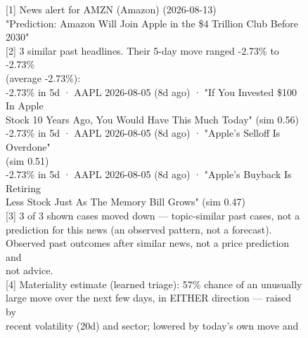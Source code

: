 \begin{figure}[ht]
\centering
\begin{tcolorbox}[colback=black!3, colframe=black!35, boxrule=0.4pt, arc=2pt,
                  width=0.97\textwidth, fontupper=\ttfamily\scriptsize]
\textcolor{black!55}{[1]} News alert for AMZN (Amazon) (2026-08-13)\\
\hspace*{1em}"Prediction: Amazon Will Join Apple in the \$4 Trillion Club Before 2030"\\[4pt]
\textcolor{black!55}{[2]} 3 similar past headlines. Their 5-day move ranged -2.73\% to -2.73\%\\
\hspace*{1em}(average -2.73\%):\\
\hspace*{1em}-2.73\% in 5d · AAPL 2026-08-05 (8d ago) · "If You Invested \$100 In Apple\\
\hspace*{2em}Stock 10 Years Ago, You Would Have This Much Today" (sim 0.56)\\
\hspace*{1em}-2.73\% in 5d · AAPL 2026-08-05 (8d ago) · "Apple's Selloff Is Overdone"\\
\hspace*{2em}(sim 0.51)\\
\hspace*{1em}-2.73\% in 5d · AAPL 2026-08-05 (8d ago) · "Apple's Buyback Is Retiring\\
\hspace*{2em}Less Stock Just As The Memory Bill Grows" (sim 0.47)\\[4pt]
\textcolor{black!55}{[3]} 3 of 3 shown cases moved down — topic-similar past cases, not a\\
\hspace*{1em}prediction for this news (an observed pattern, not a forecast).\\
\hspace*{1em}Observed past outcomes after similar news, not a price prediction and\\
\hspace*{1em}not advice.\\[4pt]
\textcolor{black!55}{[4]} Materiality estimate (learned triage): 57\% chance of an unusually\\
\hspace*{1em}large move over the next few days, in EITHER direction — raised by\\
\hspace*{1em}recent volatility (20d) and sector; lowered by today's own move and\\

\end{tcolorbox}
\end{figure}
